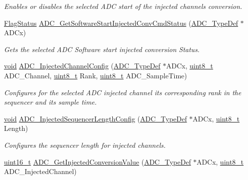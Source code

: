 \begin{DoxyCompactItemize}
\begin{DoxyCompactList}\small\item\em Enables or disables the selected A\+DC start of the injected channels conversion. \end{DoxyCompactList}\item 
\hyperlink{agilefox_2library_2inc_2stm32f10x__type_8h_a89136caac2e14c55151f527ac02daaff}{Flag\+Status} \hyperlink{group___a_d_c___exported___functions_ga8765f8835b8cfed13dce3d8d71767dcc}{A\+D\+C\+\_\+\+Get\+Software\+Start\+Injected\+Conv\+Cmd\+Status} (\hyperlink{struct_a_d_c___type_def}{A\+D\+C\+\_\+\+Type\+Def} $\ast$A\+D\+Cx)
\begin{DoxyCompactList}\small\item\em Gets the selected A\+DC Software start injected conversion Status. \end{DoxyCompactList}\item 
\hyperlink{usb__devapi_8h_afabf60e7f57651d6d595a02c75f07cd0}{void} \hyperlink{group___a_d_c___exported___functions_gae2b44bff080184e1cf6f2cb6b9bb3e59}{A\+D\+C\+\_\+\+Injected\+Channel\+Config} (\hyperlink{struct_a_d_c___type_def}{A\+D\+C\+\_\+\+Type\+Def} $\ast$A\+D\+Cx, \hyperlink{_p_e___types_8h_aba7bc1797add20fe3efdf37ced1182c5}{uint8\+\_\+t} A\+D\+C\+\_\+\+Channel, \hyperlink{_p_e___types_8h_aba7bc1797add20fe3efdf37ced1182c5}{uint8\+\_\+t} Rank, \hyperlink{_p_e___types_8h_aba7bc1797add20fe3efdf37ced1182c5}{uint8\+\_\+t} A\+D\+C\+\_\+\+Sample\+Time)
\begin{DoxyCompactList}\small\item\em Configures for the selected A\+DC injected channel its corresponding rank in the sequencer and its sample time. \end{DoxyCompactList}\item 
\hyperlink{usb__devapi_8h_afabf60e7f57651d6d595a02c75f07cd0}{void} \hyperlink{group___a_d_c___exported___functions_ga24eba90bc3ee955e07659a605011710d}{A\+D\+C\+\_\+\+Injected\+Sequencer\+Length\+Config} (\hyperlink{struct_a_d_c___type_def}{A\+D\+C\+\_\+\+Type\+Def} $\ast$A\+D\+Cx, \hyperlink{_p_e___types_8h_aba7bc1797add20fe3efdf37ced1182c5}{uint8\+\_\+t} Length)
\begin{DoxyCompactList}\small\item\em Configures the sequencer length for injected channels. \end{DoxyCompactList}\item 
\hyperlink{_p_e___types_8h_a1f1825b69244eb3ad2c7165ddc99c956}{uint16\+\_\+t} \hyperlink{group___a_d_c___exported___functions_ga1dea5ed24571a2e0ce4cbd41c9c1ec46}{A\+D\+C\+\_\+\+Get\+Injected\+Conversion\+Value} (\hyperlink{struct_a_d_c___type_def}{A\+D\+C\+\_\+\+Type\+Def} $\ast$A\+D\+Cx, \hyperlink{_p_e___types_8h_aba7bc1797add20fe3efdf37ced1182c5}{uint8\+\_\+t} A\+D\+C\+\_\+\+Injected\+Channel)

\end{DoxyCompactItemize}
